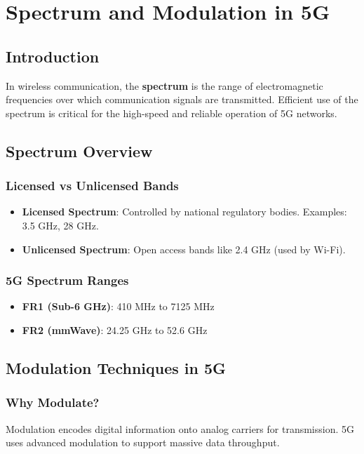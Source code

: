 
\chapter{Spectrum and Modulation in 5G}

\section{Introduction}
In wireless communication, the \textbf{spectrum} is the range of electromagnetic frequencies over which communication signals are transmitted. Efficient use of the spectrum is critical for the high-speed and reliable operation of 5G networks.

\section{Spectrum Overview}

\subsection{Licensed vs Unlicensed Bands}
\begin{itemize}
  \item \textbf{Licensed Spectrum}: Controlled by national regulatory bodies. Examples: 3.5 GHz, 28 GHz.
  \item \textbf{Unlicensed Spectrum}: Open access bands like 2.4 GHz (used by Wi-Fi).
\end{itemize}

\subsection{5G Spectrum Ranges}
\begin{itemize}
  \item \textbf{FR1 (Sub-6 GHz)}: 410 MHz to 7125 MHz
  \item \textbf{FR2 (mmWave)}: 24.25 GHz to 52.6 GHz
\end{itemize}

\section{Modulation Techniques in 5G}

\subsection{Why Modulate?}
Modulation encodes digital information onto analog carriers for transmission. 5G uses advanced modulation to support massive data throughput.

